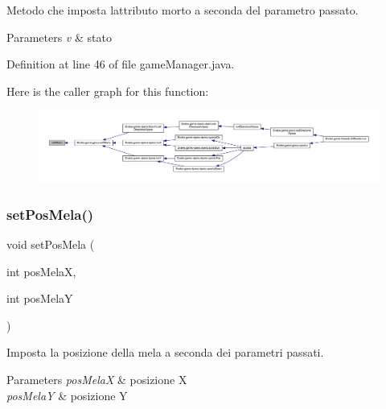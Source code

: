 Metodo che imposta l\textquotesingle{}attributo morto a seconda del parametro passato. 


\begin{DoxyParams}{Parameters}
{\em v} & stato \\
\hline
\end{DoxyParams}


Definition at line 46 of file game\+Manager.\+java.

Here is the caller graph for this function\+:
\nopagebreak
\begin{figure}[H]
\begin{center}
\leavevmode
\includegraphics[width=350pt]{class_snake_1_1game_1_1utility_1_1game_manager_a05b55f5dcc088b5655c5ff77c01f37ea_icgraph}
\end{center}
\end{figure}
\mbox{\label{class_snake_1_1game_1_1utility_1_1game_manager_a38aa4a80eb7f9db1e033f67dc1c220b0}} 
\subsubsection{\texorpdfstring{set\+Pos\+Mela()}{setPosMela()}}
{\footnotesize\ttfamily void set\+Pos\+Mela (\begin{DoxyParamCaption}\item[{int}]{pos\+MelaX,  }\item[{int}]{pos\+MelaY }\end{DoxyParamCaption})}



Imposta la posizione della mela a seconda dei parametri passati. 


\begin{DoxyParams}{Parameters}
{\em pos\+MelaX} & posizione X \\
\hline
{\em pos\+MelaY} & posizione Y \\
\hline
\end{DoxyParams}


